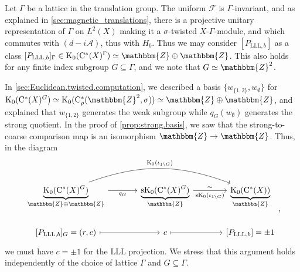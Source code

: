 \documentclass{amsart}
\numberwithin{figure}{section}
\numberwithin{equation}{section}
\numberwithin{table}{section}
\theoremstyle{plain}
\theoremstyle{definition}
\theoremstyle{remark}
\theoremstyle{nonumber}
\newcommand{\Z}{\mathbb{Z}}
\newcommand{\K}{\relax\ifmmode\operatorname{K}\else\textup{K}\fi}
\newcommand{\Cst}{\relax\ifmmode\mathrm{C}^*\else\textup{C*}\fi}
\newcommand{\Cstr}{\Cst_\rho} %
\renewcommand{\mathbb}{\mathbbm} %
\begin{document}
Let $\Gamma$ be a lattice in the translation group. The uniform $\mathscr{F}$ is $\Gamma$-invariant, and as explained in \cref{sec:magnetic_translations}, there is a projective unitary representation of $\Gamma$ on $L^2(X)$ making it a $\sigma$-twisted $X$-$\Gamma$-module, and which commutes with $(d-i\mathscr{A})$, thus with $H_b$. Thus we may consider $[P_{\mathrm{LLL},b}]$ as a class $[P_{\mathrm{LLL},b}]_\Gamma\in \K_0(\Cst(X)^\Gamma)\simeq\Z\oplus \Z$. This also holds for any finite index subgroup $G\subseteq\Gamma$, and we note that $G\simeq\Z^2$.

In \cref{sec:Euclidean.twisted.computation}, we described a basis $\{w_{\{1,2\}}, w_\emptyset\}$ for $\K_0(\Cst(X)^G)\simeq \K_0(\Cstr(\Z^2,\sigma))\simeq\Z\oplus\Z$, and explained that $w_{\{1,2\}}$ generates the weak subgroup while $q_G(w_\emptyset)$ generates the strong quotient. In the proof of \cref{prop:strong.basis}, we saw that the strong-to-coarse comparison map is an isomorphism $\Z\to \Z$. Thus, in the diagram
\begin{equation}\label{eq:K_computation_Landau}
\begin{tikzcd}[column sep=large]
\underbrace{\K_0(\Cst(X)^{G})}_{\mathbb{Z}\oplus \mathbb{Z}}
\ar[r,"q_G"']\ar[rr,"\K_0(\iota_{1\backslash G})",bend left=20] & \underbrace{{\rm sK}_0(\Cst(X)^G)}_{\mathbb{Z}} \ar[r,"\sim","{\rm sK}_0(\iota_{1\backslash G})"'] & \underbrace{\K_0(\Cst(X))}_{\mathbb{Z}}\\
{[P_{\mathrm{LLL},b}]_G}=(r,c)
\ar[r, mapsto] & c
\ar[r, mapsto] &{[P_{\mathrm{LLL},b}]}=\pm 1
\end{tikzcd},
\end{equation}
we must have $c=\pm 1$ for the LLL projection. We stress that this argument
holds independently of the choice of lattice $\Gamma$ and $G\subseteq
\Gamma$.
\end{document}
